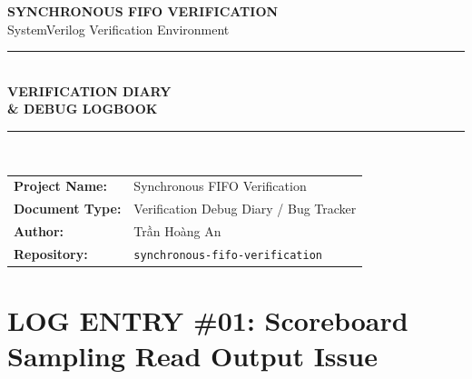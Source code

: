 \documentclass[12pt, a4paper]{article}
\begin{document}
\begin{titlepage}
    \begin{tcolorbox}[
        enhanced,
        colback=white,
        colframe=mainTitle,
        arc=0mm,
        boxrule=1.5pt,
        top=1.5cm, bottom=1.5cm, left=1cm, right=1cm,
        height=\textheight
    ]
        \centering
        
        {\Large \bfseries SYNCHRONOUS FIFO VERIFICATION}\\[0.3cm]
        {\large SystemVerilog Verification Environment}\\[2cm]
        
        \rule{0.8\linewidth}{0.8pt}\\[1.5cm]
        
        {\Huge \bfseries \color{mainTitle} VERIFICATION DIARY}\\[0.5cm]
        {\Large \bfseries \& DEBUG LOGBOOK}\\[1.5cm]
        
        \rule{0.8\linewidth}{0.8pt}\\[2.5cm]
        
        \vfill
        \begin{tabular}{ll}
            \textbf{Project Name:} & Synchronous FIFO Verification \\
            \textbf{Document Type:}& Verification Debug Diary / Bug Tracker \\
            \textbf{Author:}       & Trần Hoàng An \\
            \textbf{Repository:}   & \texttt{synchronous-fifo-verification} \\
        \end{tabular}
        
    \end{tcolorbox}
\end{titlepage}

\newpage

\section*{LOG ENTRY \#01: Scoreboard Sampling Read Output Issue}
\end{document}
